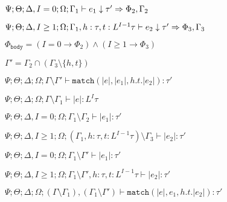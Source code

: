 {{{     $\Psi ; \Theta ; \Delta, I = 0 ; \Omega ; \Gamma_1\vdash e_1 \downarrow \tau' \Rightarrow \Phi_2,\Gamma_2$
    
     $\Psi ; \Theta ; \Delta, I \geq 1; \Omega ; \Gamma_1, h : \tau, t : L^{I-1} \tau \vdash e_2 \downarrow \tau' \Rightarrow \Phi_3,\Gamma_3$
    
     $\Phi_\texttt{body} = (I = 0 \to \Phi_2) \wedge (I \geq 1 \to \Phi_3)$
    
     $\Gamma' = \Gamma_2 \cap (\Gamma_3 \setminus \{h,t\})$
   }{
     $\Psi ; \Theta ; \Delta ; \Omega ; \Gamma \setminus \Gamma' \vdash \texttt{match}(|e|,|e_1|,h.t.|e_2|) : \tau'$   
   }
   
   
    $\Psi ; \Theta ; \Delta ; \Omega ; \Gamma \setminus \Gamma_1 \vdash |e| : L^I \tau$
   
   
    $\Psi ; \Theta ; \Delta, I = 0 ; \Omega ; \Gamma_1 \setminus \Gamma_2 \vdash |e_1| : \tau'$
   
   
    $\Psi ; \Theta ; \Delta, I \geq 1; \Omega ; (\Gamma_1, h : \tau, t : L^{I-1} \tau) \setminus \Gamma_3 \vdash |e_2| : \tau'$
   
   
    $\Psi ; \Theta ; \Delta, I = 0 ; \Omega ; \Gamma_1 \setminus \Gamma' \vdash |e_1| : \tau'$
   
    $\Psi ; \Theta ; \Delta, I \geq 1; \Omega ; \Gamma_1 \setminus \Gamma', h : \tau, t : L^{I-1} \tau \vdash |e_2| : \tau'$
   
   
    $\Psi ; \Theta ; \Delta ; \Omega ; (\Gamma \setminus \Gamma_1),(\Gamma_1 \setminus \Gamma') \vdash \texttt{match}(|e|,e_1,h.t.|e_2|) : \tau'$ 
   
 }
 
 }
